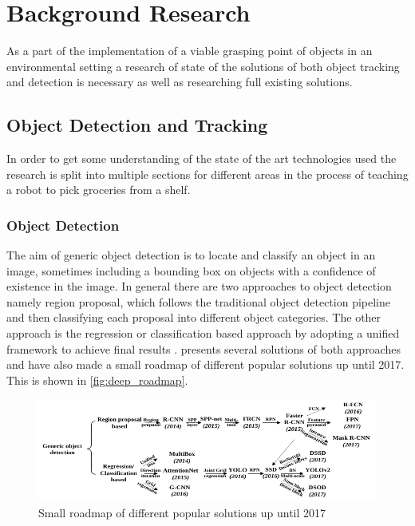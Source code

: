 \chapter{Background Research}\glsresetall
\label{cha:Research}
As a part of the implementation of a viable grasping point of objects in an environmental setting a research of state of the solutions of both object tracking and detection is necessary as well as researching full existing solutions.

\section{Object Detection and Tracking}
In order to get some understanding of the state of the art technologies used the research is split into multiple sections for different areas in the process of teaching a robot to pick groceries from a shelf.

\subsection{Object Detection}
The aim of generic object detection is to locate and classify an object in an image, sometimes including a bounding box on objects with a confidence of existence in the image. In general there are two approaches to object detection namely region proposal, which follows the traditional object detection pipeline and then classifying each proposal into different object categories. The other approach is the regression or classification based approach by adopting a unified framework to achieve final results \citep{zhao}.
\cite{zhao} presents several solutions of both approaches and have also made a small roadmap of different popular solutions up until 2017. This is shown in \autoref{fig:deep_roadmap}.

\begin{figure}[H]
  \centering
  \includegraphics[width=\textwidth]{figures/deep_roadmap.pdf}
  \caption{Small roadmap of different popular solutions up until 2017 \citep{zhao}}
  \label{fig:deep_roadmap}
\end{figure}

